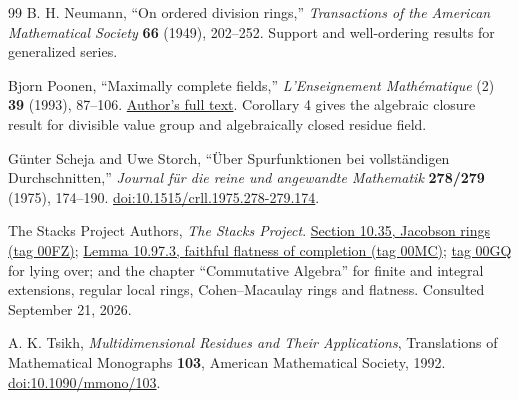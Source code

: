 \documentclass[11pt,letterpaper]{article}
\theoremstyle{definition}
\theoremstyle{remark}
\numberwithin{equation}{section}
\begin{document}
\begin{thebibliography}{99}
B. H. Neumann,
``On ordered division rings,''
\emph{Transactions of the American Mathematical Society} \textbf{66} (1949),
202--252.
Support and well-ordering results for generalized series.

Bjorn Poonen,
``Maximally complete fields,''
\emph{L'Enseignement Math\'ematique} (2) \textbf{39} (1993), 87--106.
\href{https://math.mit.edu/~poonen/papers/amsval.pdf}{Author's full text}.
Corollary 4 gives the algebraic closure result for divisible value group and
algebraically closed residue field.

G\"unter Scheja and Uwe Storch,
``\"Uber Spurfunktionen bei vollst\"andigen Durchschnitten,''
\emph{Journal f\"ur die reine und angewandte Mathematik} \textbf{278/279}
(1975), 174--190.
\href{https://doi.org/10.1515/crll.1975.278-279.174}{doi:10.1515/crll.1975.278-279.174}.

The Stacks Project Authors, \emph{The Stacks Project}.
\href{https://stacks.math.columbia.edu/tag/00FZ}{Section 10.35, Jacobson
rings (tag 00FZ)};
\href{https://stacks.math.columbia.edu/tag/00MC}{Lemma 10.97.3, faithful
flatness of completion (tag 00MC)};
\href{https://stacks.math.columbia.edu/tag/00GQ}{tag 00GQ} for lying over;
and the chapter ``Commutative Algebra'' for finite and integral extensions,
regular local rings, Cohen--Macaulay rings and flatness. Consulted
September 21, 2026.

A. K. Tsikh,
\emph{Multidimensional Residues and Their Applications},
Translations of Mathematical Monographs \textbf{103}, American Mathematical
Society, 1992.
\href{https://doi.org/10.1090/mmono/103}{doi:10.1090/mmono/103}.

\end{thebibliography}
\end{document}
